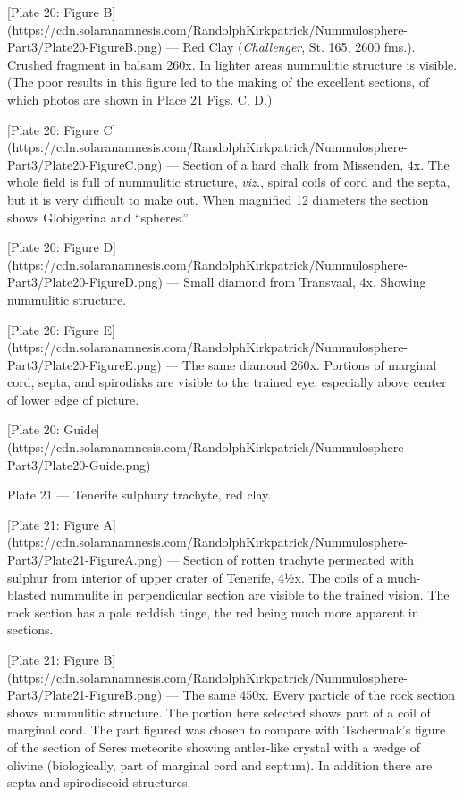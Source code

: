 \documentclass[a4paper, 12pt, oneside]{article}
\begin{document}
[Plate 20: Figure B](https://cdn.solaranamnesis.com/RandolphKirkpatrick/Nummulosphere-Part3/Plate20-FigureB.png) --- Red Clay (\emph{Challenger}, St. 165, 2600 fms.). Crushed fragment in balsam 260x. In lighter areas nummulitic structure is visible. (The poor results in this figure led to the making of the excellent sections, of which photos are shown in Place 21 Figs. C, D.)

[Plate 20: Figure C](https://cdn.solaranamnesis.com/RandolphKirkpatrick/Nummulosphere-Part3/Plate20-FigureC.png) --- Section of a hard chalk from Missenden, 4x. The whole field is full of nummulitic structure, \emph{viz.}, spiral coils of cord and the septa, but it is very difficult to make out. When magnified 12 diameters the section shows Globigerina and ``spheres.''

[Plate 20: Figure D](https://cdn.solaranamnesis.com/RandolphKirkpatrick/Nummulosphere-Part3/Plate20-FigureD.png) --- Small diamond from Transvaal, 4x. Showing nummulitic structure.

[Plate 20: Figure E](https://cdn.solaranamnesis.com/RandolphKirkpatrick/Nummulosphere-Part3/Plate20-FigureE.png) --- The same diamond 260x. Portions of marginal cord, septa, and spirodisks are visible to the trained eye, especially above center of lower edge of picture.

[Plate 20: Guide](https://cdn.solaranamnesis.com/RandolphKirkpatrick/Nummulosphere-Part3/Plate20-Guide.png)

Plate 21 --- Tenerife sulphury trachyte, red clay.

[Plate 21: Figure A](https://cdn.solaranamnesis.com/RandolphKirkpatrick/Nummulosphere-Part3/Plate21-FigureA.png) --- Section of rotten trachyte permeated with sulphur from interior of upper crater of Tenerife, 4½x. The coils of a much-blasted nummulite in perpendicular section are visible to the trained vision. The rock section has a pale reddish tinge, the red being much more apparent in sections.

[Plate 21: Figure B](https://cdn.solaranamnesis.com/RandolphKirkpatrick/Nummulosphere-Part3/Plate21-FigureB.png) --- The same 450x. Every particle of the rock section shows nummulitic structure. The portion here selected shows part of a coil of marginal cord. The part figured was chosen to compare with Tschermak's figure of the section of Seres meteorite showing antler-like crystal with a wedge of olivine (biologically, part of marginal cord and septum). In addition there are septa and spirodiscoid structures.
\end{document}
